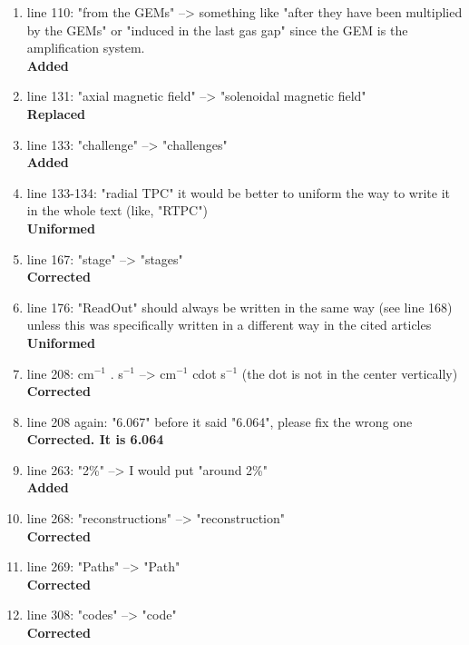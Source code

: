 \documentclass[a4paper,11pt,twoside]{article}
\begin{document}
\begin{enumerate}
\item line 110: "from the GEMs" -->  something like "after they have been 
   multiplied by the GEMs" or "induced in the last gas gap" since the GEM is 
   the amplification system.\\
{ \bf Added} 

\item line 131: "axial magnetic field" --> "solenoidal magnetic field"\\
{ \bf Replaced} 

\item line 133: "challenge" --> "challenges"\\
{ \bf Added} 

\item line 133-134: "radial TPC" it would be better to uniform the way to write 
   it in the whole text (like, "RTPC")\\
{ \bf Uniformed} 

\item line 167: "stage" --> "stages"\\
{ \bf Corrected} 

\item line 176: "ReadOut" should always be written in the same way (see line 
   168) unless this was specifically written in a different way in the cited 
   articles\\
{ \bf Uniformed} 

\item line 208: cm$^{-1}$ . s$^{-1}$ --> cm$^{-1}$ cdot s$^{-1}$ (the dot is 
   not in the center vertically)\\
{ \bf Corrected} 

\item line 208 again: "6.067" before it said "6.064", please fix the wrong one
{ \bf Corrected. It is 6.064} \\

\item line 263: "2\%" --> I would put "around 2\%"\\
{ \bf Added} 

\item line 268: "reconstructions" --> "reconstruction"\\
{ \bf Corrected } 

\item line 269: "Paths" --> "Path"\\
{ \bf Corrected} 

\item line 308: "codes" --> "code"\\
{ \bf Corrected} 


\end{enumerate}
\end{document}
